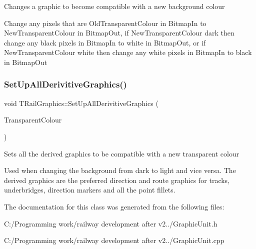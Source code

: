 Changes a graphic to become compatible with a new background colour

Change any pixels that are Old\+Transparent\+Colour in Bitmap\+In to New\+Transparent\+Colour in Bitmap\+Out, if New\+Transparent\+Colour dark then change any black pixels in Bitmap\+In to white in Bitmap\+Out, or if New\+Transparent\+Colour white then change any white pixels in Bitmap\+In to black in Bitmap\+Out \mbox{\label{class_t_rail_graphics_ae19696d461eea07c5444ed4c9714acf3}} 
\subsubsection{\texorpdfstring{Set\+Up\+All\+Derivitive\+Graphics()}{SetUpAllDerivitiveGraphics()}}
{\footnotesize\ttfamily void T\+Rail\+Graphics\+::\+Set\+Up\+All\+Derivitive\+Graphics (\begin{DoxyParamCaption}\item[{T\+Color}]{Transparent\+Colour }\end{DoxyParamCaption})}

Sets all the derived graphics to be compatible with a new transparent colour

Used when changing the background from dark to light and vice versa. The derived graphics are the preferred direction and route graphics for tracks, underbridges, direction markers and all the point fillets. 

The documentation for this class was generated from the following files\+:\begin{DoxyCompactItemize}
\item 
C\+:/\+Programming work/railway development after v2../Graphic\+Unit.\+h\item 
C\+:/\+Programming work/railway development after v2../Graphic\+Unit.\+cpp\end{DoxyCompactItemize}
